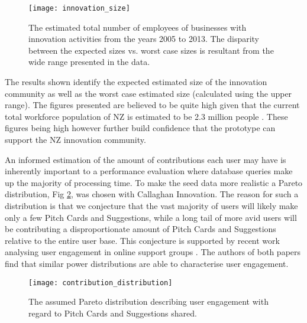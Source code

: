 \begin{figure}[ht]
    \centering
    \texttt{[image: innovation\_size]}
    \caption{The estimated total number of employees of businesses with innovation activities from the years 2005 to 2013. The disparity between the expected sizes vs. worst case sizes is resultant from the wide range presented in the data.}
    \label{fig:innovation_size}
\end{figure}

The results shown identify the expected estimated size of the innovation community as well as the worst case estimated size (calculated using the upper range). The figures presented are believed to be quite high given that the current total workforce population of NZ is estimated to be 2.3 million people \cite{WorkingPopulation:online}. These figures being high however further build confidence that the prototype can support the NZ innovation community.

An informed estimation of the amount of contributions each user may have is inherently important to a performance evaluation where database queries make up the majority of processing time. To make the seed data more realistic a Pareto distribution, Fig \ref{fig:contribution_distribution}, was chosen with Callaghan Innovation. The reason for such a distribution is that we conjecture that the vast majority of users will likely make only a few Pitch Cards and Suggestions, while a long tail of more avid users will be contributing a disproportionate amount of Pitch Cards and Suggestions relative to the entire user base. This conjecture is supported by recent work analysing user engagement in online support groups \cite{carron2014describing}\cite{van2015mapping}. The authors of both papers find that similar power distributions are able to characterise user engagement.

\begin{figure}[ht]
    \centering
    \texttt{[image: contribution\_distribution]}
    \caption{The assumed Pareto distribution describing user engagement with regard to Pitch Cards and Suggestions shared.}
    \label{fig:contribution_distribution}
\end{figure}

